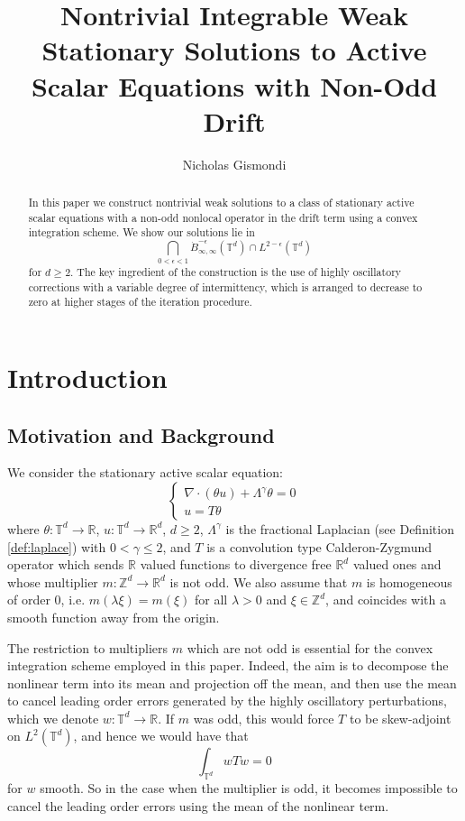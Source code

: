\documentclass[12pt,reqno,letterpaper]{amsart}
\numberwithin{equation}{section}
\newcommand{\1}{{\bf 1}}
\newcommand{\2}{{\bf 2}}
\newcommand{\R}{\mathbb R}
\newcommand{\T}{\mathbb T}
\newcommand{\Z}{\mathbb Z}
\theoremstyle{remark}
\theoremstyle{remark}
\begin{document}
\author{Nicholas Gismondi}

\title{Nontrivial Integrable Weak Stationary Solutions to Active Scalar Equations with Non-Odd Drift}

\begin{abstract}
    In this paper we construct nontrivial weak solutions to a class of stationary active scalar equations with a non-odd nonlocal operator in the drift term using a convex integration scheme. We show our solutions lie in
    $$
    \bigcap_{0 < \epsilon < 1} \dot{B}^{-\epsilon}_{\infty,\infty}(\T^d) \cap L^{2-\epsilon}(\T^d)
    $$
    for $d \geq 2$. The key ingredient of the construction is the use of highly oscillatory corrections with a variable degree of intermittency, which is arranged to decrease to zero at higher stages of the iteration procedure.
\end{abstract}

\maketitle

\section{Introduction}



\subsection{Motivation and Background}
We consider the stationary active scalar equation:
\begin{equation}\label{eq:stat_eqn}
\begin{cases}
    \nabla \cdot (\theta u) + \Lambda^\gamma \theta = 0\\
    u = T\theta
\end{cases}
\end{equation}
where $\theta:\T^d \to \R$, $u:\T^d \to \R^d$, $d \geq 2$, $\Lambda^\gamma$ is the fractional Laplacian (see Definition \ref{def:laplace}) with $0 < \gamma \leq 2$, and $T$ is a convolution type Calderon-Zygmund operator which sends $\R$ valued functions to divergence free $\R^d$ valued ones and whose multiplier $m:\Z^d \to \R^d$ is not odd. We also assume that $m$ is homogeneous of order $0$, i.e. $m(\lambda \xi) = m(\xi)$ for all $\lambda > 0$ and $\xi \in \Z^d$, and coincides with a smooth function away from the origin.

The restriction to multipliers $m$ which are not odd is essential for the convex integration scheme employed in this paper. Indeed, the aim is to decompose the nonlinear term into its mean and projection off the mean, and then use the mean to cancel leading order errors generated by the highly oscillatory perturbations, which we denote $w:\T^d \to \R$. If $m$ was odd, this would force $T$ to be skew-adjoint on $L^2(\T^d)$, and hence we would have that
$$
\int_{\T^d} w Tw = 0
$$
for $w$ smooth. So in the case when the multiplier is odd, it becomes impossible to cancel the leading order errors using the mean of the nonlinear term.
\end{document}
